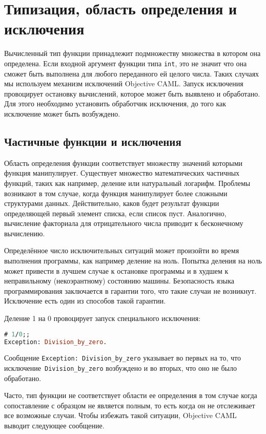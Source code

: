 \section{Типизация, область определения и исключения}

Вычисленный тип функции принадлежит подмножеству множества в котором она
определена. Если входной аргумент функции типа \texttt{int}, это не значит что
она сможет быть выполнена для любого переданного ей целого числа. Таких случаях
мы используем механизм исключений Objective CAML. Запуск исключения провоцирует
остановку вычислений, которое может быть выявлено и обработано. Для этого
необходимо установить обработчик исключения, до того как исключение может быть
возбуждено.

\subsection{Частичные функции и исключения}

Область определения функции соответствует множеству значений которыми функция
манипулирует. Существует множество математических частичных функций, таких как
например, деление или натуральный логарифм. Проблемы возникают в том случае,
когда функция манипулирует более сложными структурами данных. Действительно,
каков будет результат функции определяющей первый элемент списка, если список
пуст. Аналогично, вычисление факториала для отрицательного числа приводит к
бесконечному вычислению.

Определённое число исключительных ситуаций может произойти во время выполнения
программы, как например деление на ноль. Попытка деления на ноль может привести
в лучшем случае к остановке программы и в худшем к неправильному (некоэрантному)
состоянию машины. Безопасность языка программирования заключается в гарантии
того, что такие случаи не возникнут. Исключение есть один из способов такой
гарантии.

Деление 1 на 0 провоцирует запуск специального исключения:

\begin{lstlisting}[language=OCaml]
# 1/0;;
Exception: Division_by_zero.
\end{lstlisting}

Сообщение \texttt{Exception: Division\_by\_zero} указывает во первых на то, что
исключение\texttt{ Division\_by\_zero} возбуждено и во вторых, что оно не было
обработано.

Часто, тип функции не соответствует области ее определения в том случае когда
сопоставление с образцом не является полным, то есть когда он не отслеживает все
возможные случаи. Чтобы избежать такой ситуации, Objective CAML выводит
следующее сообщение.

